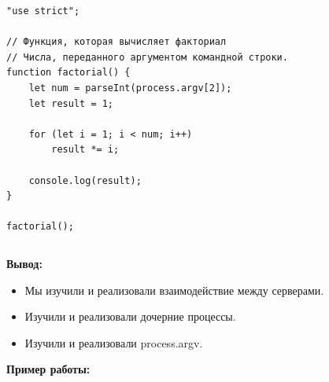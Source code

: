 \begin{lstlisting}[caption=Код программы. TASK\_2. Дочерний процесс.]
"use strict";

// Функция, которая вычисляет факториал
// Числа, переданного аргументом командной строки.
function factorial() {
	let num = parseInt(process.argv[2]);
	let result = 1;

	for (let i = 1; i < num; i++)
		result *= i;

	console.log(result);
}

factorial();
\end{lstlisting}

\begin{lstlisting}[caption=Код программы. TASK\_2. Главный файл]
\end{lstlisting}


\textbf{Вывод:}

\begin{itemize} 
	\item Мы изучили и реализовали взаимодействие между серверами.
	\item Изучили и реализовали дочерние процессы.
	\item Изучили и реализовали process.argv.
\end{itemize}


\textbf{Пример работы:}

\begin{figure}[ht!]
\end{figure}
